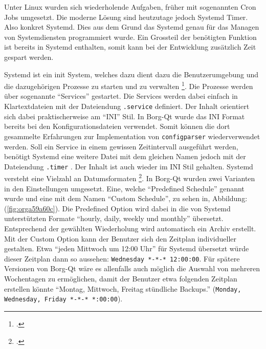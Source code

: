 Unter Linux wurden sich wiederholende Aufgaben, früher mit sogenannten Cron
Jobs umgesetzt. Die moderne Lösung sind heutzutage jedoch Systemd Timer. Also
konkret Systemd. Dies aus dem Grund das Systemd genau für das Managen von
Systemdiensten programmiert wurde. Ein Grossteil der benötigten Funktion ist
bereits in Systemd enthalten, somit kann bei der Entwicklung zusätzlich Zeit
gespart werden.

Systemd ist ein init System, welches dazu dient dazu die Benutzerumgebung und
die dazugehörigen Prozesse zu starten und zu verwalten \footcite{systemd}. Die
Prozesse werden über sogenannte "`Services"' gestartet. Die Services werden dabei
einfach in Klartextdateien mit der Dateiendung \texttt{.service} definiert. Der Inhalt
orientiert sich dabei praktischerweise am "`INI"' Stil. In Borg-Qt wurde das INI
Format bereits bei den Konfigurationsdateien verwendet. Somit können die dort
gesammelte Erfahrungen zur Implementation von \texttt{configparser} wiederverwendet
werden. Soll ein Service in einem gewissen Zeitintervall ausgeführt werden,
benötigt Systemd eine weitere Datei mit dem gleichen Namen jedoch mit der
Dateiendung \texttt{.timer} . Der Inhalt ist auch wieder im INI Stil gehalten. Systemd
versteht eine Vielzahl an Datumsformaten \footcite{systemddate}. In Borg-Qt
wurden zwei Varianten in den Einstellungen umgesetzt. Eine, welche "`Predefined
Schedule"' genannt wurde und eine mit dem Namen "`Custom Schedule"', zu sehen in,
Abbildung:(\ref{fig:orga59a60c}). Die Predefined Option wird dabei in die von Systemd
unterstützten Formate "`hourly, daily, weekly und monthly"' übersetzt.
Entsprechend der gewählten Wiederholung wird automatisch ein Archiv erstellt.
Mit der Custom Option kann der Benutzer sich den Zeitplan individueller
gestalten. Etwa "`jeden Mittwoch um 12:00 Uhr"' für Systemd übersetzt würde
dieser Zeitplan dann so aussehen: \texttt{Wednesday *-*-* 12:00:00}. Für spätere
Versionen von Borg-Qt wäre es allenfalls auch möglich die Auswahl von mehreren
Wochentagen zu ermöglichen, damit der Benutzer etwa folgenden Zeitplan erstellen
könnte "`Montag, Mittwoch, Freitag stündliche Backups."' (\texttt{Monday, Wednesday,
Friday *-*-* *:00:00}).

